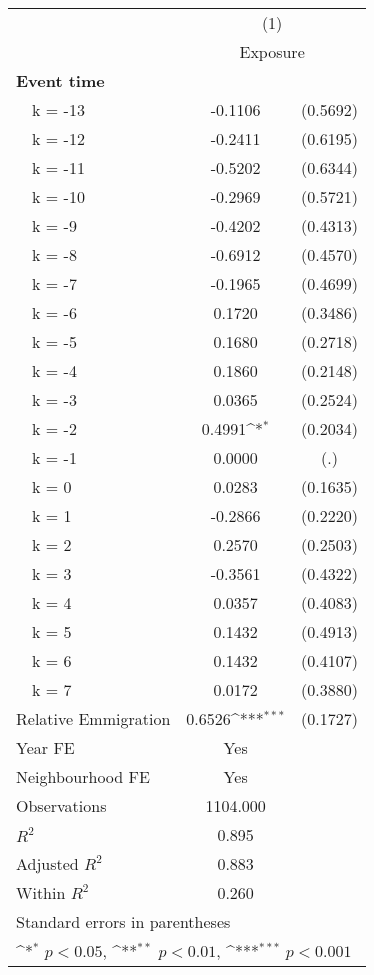 {
\def\sym#1{\ifmmode^{#1}\else\(^{#1}\)\fi}
\begin{tabular}{l*{1}{cc}}
\toprule
                &\multicolumn{2}{c}{(1)}     \\
                &\multicolumn{2}{c}{Exposure}\\
\midrule
\textbf{Event time}&                  &         \\
~~k = -13       &  -0.1106         & (0.5692)\\
~~k = -12       &  -0.2411         & (0.6195)\\
~~k = -11       &  -0.5202         & (0.6344)\\
~~k = -10       &  -0.2969         & (0.5721)\\
~~k = -9        &  -0.4202         & (0.4313)\\
~~k = -8        &  -0.6912         & (0.4570)\\
~~k = -7        &  -0.1965         & (0.4699)\\
~~k = -6        &   0.1720         & (0.3486)\\
~~k = -5        &   0.1680         & (0.2718)\\
~~k = -4        &   0.1860         & (0.2148)\\
~~k = -3        &   0.0365         & (0.2524)\\
~~k = -2        &   0.4991\sym{*}  & (0.2034)\\
~~k = -1        &   0.0000         &      (.)\\
~~k = 0         &   0.0283         & (0.1635)\\
~~k = 1         &  -0.2866         & (0.2220)\\
~~k = 2         &   0.2570         & (0.2503)\\
~~k = 3         &  -0.3561         & (0.4322)\\
~~k = 4         &   0.0357         & (0.4083)\\
~~k = 5         &   0.1432         & (0.4913)\\
~~k = 6         &   0.1432         & (0.4107)\\
~~k = 7         &   0.0172         & (0.3880)\\
Relative Emmigration&   0.6526\sym{***}& (0.1727)\\
Year FE         &    {Yes}         &         \\
Neighbourhood FE&    {Yes}         &         \\
\midrule
Observations    & 1104.000         &         \\
\(R^{2}\)       &    0.895         &         \\
Adjusted \(R^{2}\)&    0.883         &         \\
Within \(R^{2}\)&    0.260         &         \\
\bottomrule
\multicolumn{3}{l}{\footnotesize Standard errors in parentheses}\\
\multicolumn{3}{l}{\footnotesize \sym{*} \(p<0.05\), \sym{**} \(p<0.01\), \sym{***} \(p<0.001\)}\\
\end{tabular}
}
